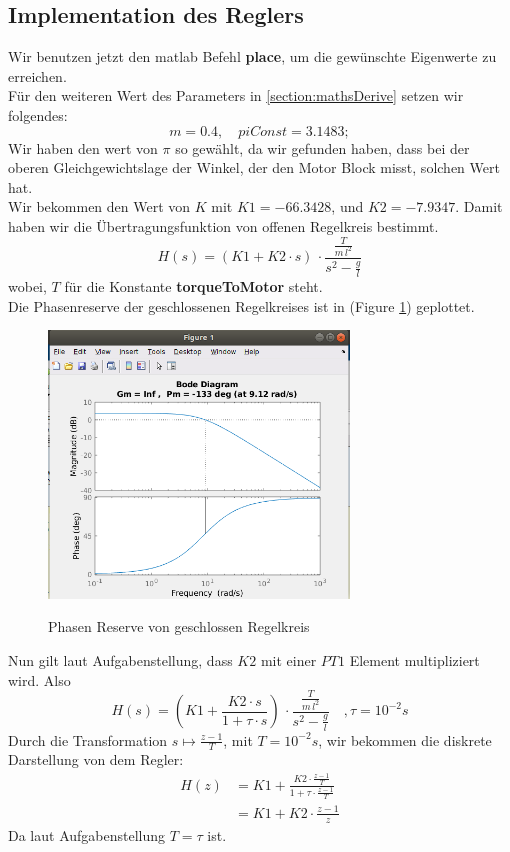 \documentclass{article}
\begin{document}
\subsection{Implementation des Reglers}\label{section:reglerImplement}
Wir benutzen jetzt den matlab Befehl \textbf{place}, um die gewünschte Eigenwerte zu erreichen.\\
Für den weiteren Wert des Parameters in \ref{section:mathsDerive} setzen wir folgendes:
\[
  m = 0.4, \quad piConst = 3.1483;
\]
Wir haben den wert von $\pi$ so gewählt, da wir gefunden haben, dass bei 
der oberen Gleichgewichtslage der Winkel, der den Motor Block misst, solchen
Wert hat. \\ 
Wir bekommen den Wert von $K$ mit $K1 = -66.3428$, und $K2 = -7.9347$. Damit haben wir die Übertragungsfunktion von offenen Regelkreis bestimmt.
\[
	H(s) = (K1 + K2 \cdot s) \, \cdot \frac{\frac{T}{m\,l^2}}{s^2 - \frac{g}{l}}
\]
wobei, $T$ für die Konstante \textbf{torqueToMotor} steht. \\
Die Phasenreserve der geschlossenen Regelkreises ist in (Figure \ref{fig:phaseMargin}) geplottet.
\begin{figure}[h]
	\caption{Phasen Reserve von geschlossen Regelkreis}
	\centering
	\includegraphics[width=8cm]{phaseMargin}
	\label{fig:phaseMargin}
\end{figure}
Nun gilt laut Aufgabenstellung, dass $K2$ mit einer $PT1$ Element multipliziert wird. Also
\[
	H(s) = (K1 + \frac{K2 \cdot s}{1 + \tau \cdot s}) \, \cdot \frac{\frac{T}{m\,l^2}}{s^2 - \frac{g}{l}}\quad, \tau = 10^{-2}s
\]
Durch die Transformation $s \mapsto \frac{z - 1}{T}$, mit $T = 10^{-2} s$, wir bekommen die diskrete Darstellung von dem Regler:
\begin{align*}
	H(z) &= K1 + \frac{K2\cdot\frac{z - 1}{T}}{1 + \tau \cdot \frac{z-1}{T}} \\
		&= K1 + K2 \cdot \frac{z - 1}{z}
\end{align*}
Da laut Aufgabenstellung $T = \tau$ ist.
\end{document}
